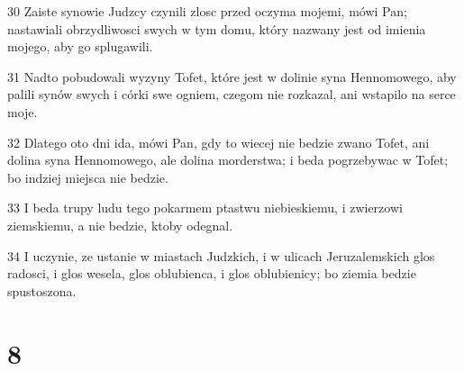 \par 30 Zaiste synowie Judzcy czynili zlosc przed oczyma mojemi, mówi Pan; nastawiali obrzydliwosci swych w tym domu, który nazwany jest od imienia mojego, aby go splugawili.
\par 31 Nadto pobudowali wyzyny Tofet, które jest w dolinie syna Hennomowego, aby palili synów swych i córki swe ogniem, czegom nie rozkazal, ani wstapilo na serce moje.
\par 32 Dlatego oto dni ida, mówi Pan, gdy to wiecej nie bedzie zwano Tofet, ani dolina syna Hennomowego, ale dolina morderstwa; i beda pogrzebywac w Tofet; bo indziej miejsca nie bedzie.
\par 33 I beda trupy ludu tego pokarmem ptastwu niebieskiemu, i zwierzowi ziemskiemu, a nie bedzie, ktoby odegnal.
\par 34 I uczynie, ze ustanie w miastach Judzkich, i w ulicach Jeruzalemskich glos radosci, i glos wesela, glos oblubienca, i glos oblubienicy; bo ziemia bedzie spustoszona.

\chapter{8}

